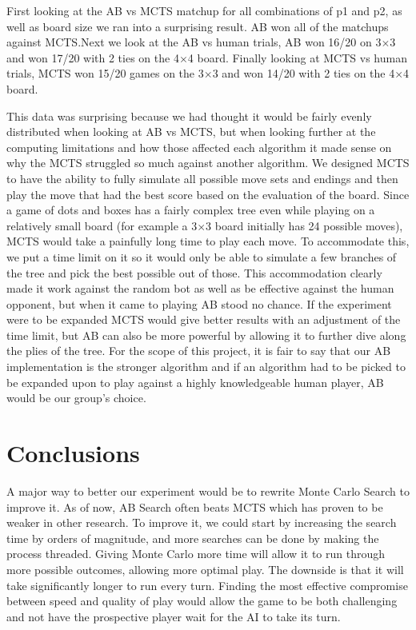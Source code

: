 \documentclass[12pt]{article}
\begin{document}
    First looking at the AB vs MCTS matchup for all combinations of p1 and p2, as well as board size we ran into a surprising result. AB won all of the matchups against MCTS.\@ Next we look at the AB vs human trials,  AB won 16/20 on 3\(\times\)3 and won 17/20 with 2 ties on the 4\(\times\)4 board. Finally looking at MCTS vs human trials, MCTS won 15/20 games on the 3\(\times\)3 and won 14/20 with 2 ties on the 4\(\times\)4 board.
    
    This data was surprising because we had thought it would be fairly evenly distributed when looking at AB vs MCTS, but when looking further at the computing limitations and how those affected each algorithm it made sense on why the MCTS struggled so much against another algorithm. We designed MCTS to have the ability to fully simulate all possible move sets and endings and then play the move that had the best score based on the evaluation of the board. Since a game of dots and boxes has a fairly complex tree even while playing on a relatively small board (for example a 3\(\times\)3 board initially has 24 possible moves), MCTS would take a painfully long time to play each move. To accommodate this, we put a time limit on it so it would only be able to simulate a few branches of the tree and pick the best possible out of those. This accommodation clearly made it work against the random bot as well as be effective against the human opponent, but when it came to playing AB stood no chance. If the experiment were to be expanded MCTS would give better results with an adjustment of the time limit, but AB can also be more powerful by allowing it to further dive along the plies of the tree. For the scope of this project, it is fair to say that our AB implementation is the stronger algorithm and if an algorithm had to be picked to be expanded upon to play against a highly knowledgeable human player, AB would be our group's choice. 
    
    \section{Conclusions}
    A major way to better our experiment would be to rewrite Monte Carlo Search to improve it. As of now, AB Search often beats MCTS which has proven to be weaker in other research. To improve it, we could start by increasing the search time by orders of magnitude, and more searches can be done by making the process threaded. Giving Monte Carlo more time will allow it to run through more possible outcomes, allowing more optimal play. The downside is that it will take significantly longer to run every turn. Finding the most effective compromise between speed and quality of play would allow the game to be both challenging and not have the prospective player wait for the AI to take its turn.
\end{document}
